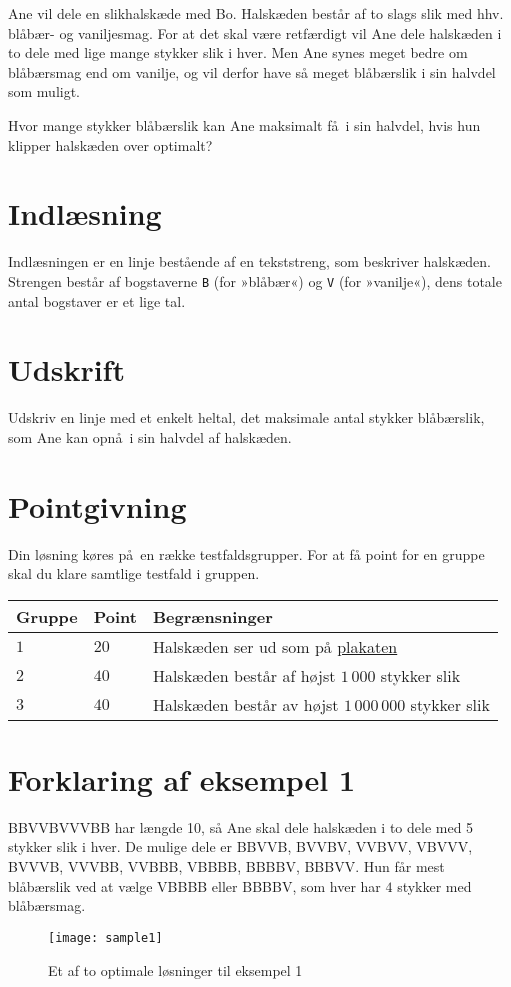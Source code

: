 Ane vil dele en slikhalskæde med Bo.
Halskæden består af to slags slik med hhv. blåbær- og vaniljesmag.
For at det skal være retfærdigt vil Ane dele halskæden i to dele med lige mange stykker slik i hver.
Men Ane synes meget bedre om blåbærsmag end om vanilje, og vil derfor have så meget blåbærslik i sin halvdel som muligt.

Hvor mange stykker blåbærslik kan Ane maksimalt få i sin halvdel, hvis hun klipper halskæden over optimalt?

\section*{Indlæsning}
Indlæsningen er en linje bestående af en tekststreng, som beskriver halskæden.
Strengen består af bogstaverne \texttt{B} (for »blåbær«) og \texttt{V} (for »vanilje«), dens totale antal bogstaver er et lige tal.

\section*{Udskrift}
Udskriv en linje med et enkelt heltal, det maksimale antal stykker blåbærslik, som Ane kan opnå i sin halvdel af halskæden.

\section*{Pointgivning}

Din løsning køres på en række testfaldsgrupper.
For at få point for en gruppe skal du klare samtlige testfald i gruppen.

\noindent
\begin{tabular}{| l | l | l |}
\hline
Gruppe & Point & Begrænsninger \\ \hline
$1$   & $20$       & Halskæden ser ud som på \href{https://www.progolymp.se/2020/affisch.pdf}{plakaten} \\ \hline
$2$   & $40$       & Halskæden består af højst $1\,000$ stykker slik\\ \hline
$3$   & $40$       & Halskæden består av højst $1\,000\,000$ stykker slik \\ \hline
\end{tabular}

\section*{Forklaring af eksempel 1}
BBVVBVVVBB har længde 10, så Ane skal dele halskæden i to dele med 5 stykker slik i hver.
De mulige dele er BBVVB, BVVBV, VVBVV, VBVVV, BVVVB, VVVBB, VVBBB, VBBBB, BBBBV, BBBVV.
Hun får mest blåbærslik  ved at vælge VBBBB eller BBBBV, som hver har $4$ stykker med blåbærsmag.

\begin{figure}[h]
	\centering
\texttt{[image: sample1]}
\caption{Et af to optimale løsninger til eksempel 1}
\end{figure}
